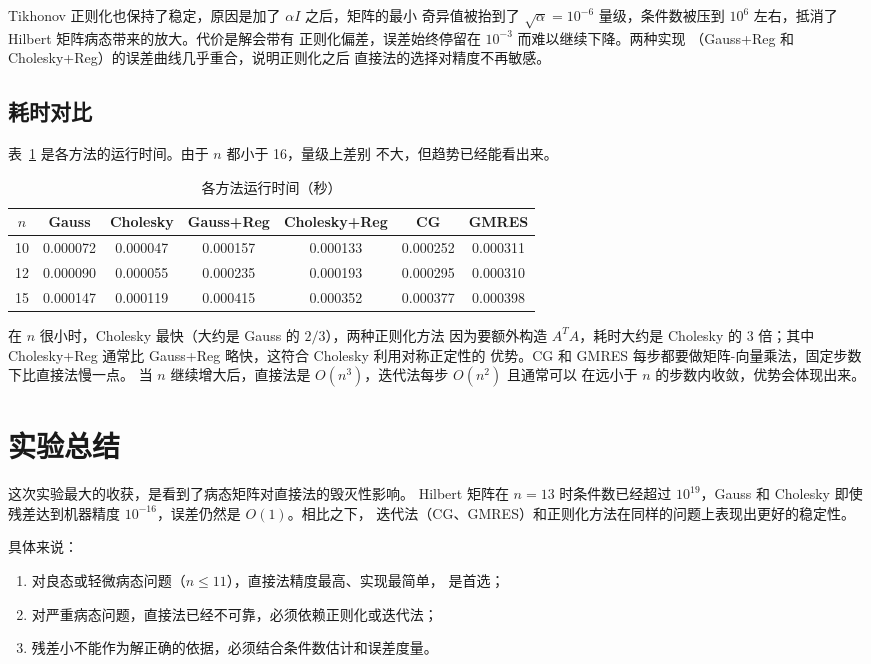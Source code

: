 \documentclass[UTF8]{ctexart}
\begin{document}
Tikhonov 正则化也保持了稳定，原因是加了 $\alpha I$ 之后，矩阵的最小
奇异值被抬到了 $\sqrt{\alpha}=10^{-6}$ 量级，条件数被压到
$10^{6}$ 左右，抵消了 Hilbert 矩阵病态带来的放大。代价是解会带有
正则化偏差，误差始终停留在 $10^{-3}$ 而难以继续下降。两种实现
（Gauss+Reg 和 Cholesky+Reg）的误差曲线几乎重合，说明正则化之后
直接法的选择对精度不再敏感。

\subsection{耗时对比}

表~\ref{tab:time} 是各方法的运行时间。由于 $n$ 都小于 16，量级上差别
不大，但趋势已经能看出来。

\begin{table}[H]
\centering
\small
\caption{各方法运行时间（秒）}
\label{tab:time}
\begin{tabular}{c|cccccc}
\toprule
$n$ & Gauss & Cholesky & Gauss+Reg & Cholesky+Reg & CG & GMRES \\
\midrule
10 & 0.000072 & 0.000047 & 0.000157 & 0.000133 & 0.000252 & 0.000311 \\
12 & 0.000090 & 0.000055 & 0.000235 & 0.000193 & 0.000295 & 0.000310 \\
15 & 0.000147 & 0.000119 & 0.000415 & 0.000352 & 0.000377 & 0.000398 \\
\bottomrule
\end{tabular}
\end{table}

在 $n$ 很小时，Cholesky 最快（大约是 Gauss 的 $2/3$），两种正则化方法
因为要额外构造 $A^TA$，耗时大约是 Cholesky 的 $3$ 倍；其中
Cholesky+Reg 通常比 Gauss+Reg 略快，这符合 Cholesky 利用对称正定性的
优势。CG 和 GMRES 每步都要做矩阵-向量乘法，固定步数下比直接法慢一点。
当 $n$ 继续增大后，直接法是 $O(n^3)$，迭代法每步 $O(n^2)$ 且通常可以
在远小于 $n$ 的步数内收敛，优势会体现出来。

\section{实验总结}

这次实验最大的收获，是看到了病态矩阵对直接法的毁灭性影响。
Hilbert 矩阵在 $n=13$ 时条件数已经超过 $10^{19}$，Gauss 和 Cholesky
即使残差达到机器精度 $10^{-16}$，误差仍然是 $O(1)$。相比之下，
迭代法（CG、GMRES）和正则化方法在同样的问题上表现出更好的稳定性。

具体来说：

\begin{enumerate}
  \item 对良态或轻微病态问题（$n\le 11$），直接法精度最高、实现最简单，
        是首选；
  \item 对严重病态问题，直接法已经不可靠，必须依赖正则化或迭代法；
  \item 残差小不能作为解正确的依据，必须结合条件数估计和误差度量。
\end{enumerate}
\end{document}
